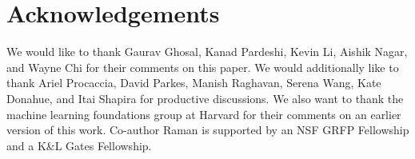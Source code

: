 \section*{Acknowledgements}
We would like to thank Gaurav Ghosal, Kanad Pardeshi, Kevin Li, Aishik Nagar, and Wayne Chi for their comments on this paper. 
We would additionally like to thank Ariel Procaccia, David Parkes, Manish Raghavan, Serena Wang, Kate Donahue, and Itai Shapira for productive discussions. 
We also want to thank the machine learning foundations group at Harvard for their comments on an earlier version of this work. 
Co-author Raman is supported by an NSF GRFP Fellowship and a K\&L Gates Fellowship.
